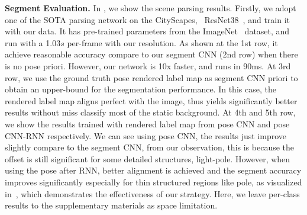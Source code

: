 \textbf{Segment Evaluation.}
In , we show the scene parsing results. 
Firstly, we adopt one of the SOTA parsing network on the CityScapes, \ie~ResNet38~\cite{WuSH16e}, and train it with our data. It has pre-trained parameters from the ImageNet~\cite{deng2009imagenet} dataset, and run with a 1.03$s$ per-frame with our resolution. As shown at the 1st row, it achieve reasonable accuracy compare to our segment CNN (2nd row) when there is no pose priori. However, our network is 10x faster, and runs in 90ms. 
At 3rd row, we use the ground truth pose rendered label map as segment CNN priori to obtain an upper-bound for the segmentation performance. 
In this case, the rendered label map aligns perfect with the image, thus yields significantly better results without miss classify most of the static background.
At 4th and 5th row, we show the results trained with rendered label map from pose CNN and pose CNN-RNN respectively. We can see using pose CNN, the results just improve slightly compare to the segment CNN, from our observation, this is because the offset is still significant for some detailed structures, \eg light-pole.
However, when using the pose after RNN, better alignment is achieved and the segment accuracy improves significantly especially for thin structured regions like pole, as visualized in~, which demonstrates the effectiveness of our strategy. 
Here, we leave per-class results to the supplementary materials as space limitation.


